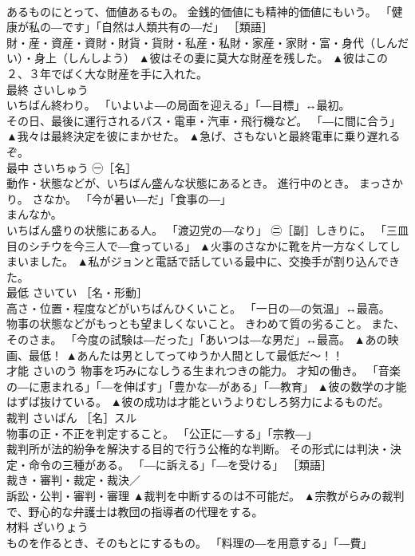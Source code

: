 \documentclass[8pt]{extreport}
\begin{document}
\begin{CJK}{UTF8}{min}
\\	あるものにとって、価値あるもの。 金銭的価値にも精神的価値にもいう。 「健康が私の―です」「自然は人類共有の―だ」 ［類語］
\\	財・産・資産・資財・財貨・貨財・私産・私財・家産・家財・富・身代（しんだい）・身上（しんしよう）	▲彼はその妻に莫大な財産を残した。 ▲彼はこの２、３年でばく大な財産を手に入れた。
\\	最終	さいしゅう	
\\	いちばん終わり。 「いよいよ―の局面を迎える」「―目標」↔最初。 
\\	その日、最後に運行されるバス・電車・汽車・飛行機など。 「―に間に合う」	▲我々は最終決定を彼にまかせた。 ▲急げ、さもないと最終電車に乗り遅れるぞ。
\\	最中	さいちゅう	㊀［名］ 
\\	動作・状態などが、いちばん盛んな状態にあるとき。 進行中のとき。 まっさかり。 さなか。 「今が暑い―だ」「食事の―」 
\\	まんなか。 
\\	いちばん盛りの状態にある人。 「渡辺党の―なり」 ㊁［副］しきりに。 「三皿目のシチウを今三人で―食っている」	▲火事のさなかに靴を片一方なくしてしまいました。 ▲私がジョンと電話で話している最中に、交換手が割り込んできた。
\\	最低	さいてい	［名・形動］ 
\\	高さ・位置・程度などがいちばんひくいこと。 「一日の―の気温」↔最高。 
\\	物事の状態などがもっとも望ましくないこと。 きわめて質の劣ること。 また、そのさま。 「今度の試験は―だった」「あいつは―な男だ」↔最高。	▲あの映画、最低！ ▲あんたは男としてってゆうか人間として最低だ〜！！
\\	才能	さいのう	物事を巧みになしうる生まれつきの能力。 才知の働き。 「音楽の―に恵まれる」「―を伸ばす」「豊かな―がある」「―教育」	▲彼の数学の才能はずば抜けている。 ▲彼の成功は才能というよりむしろ努力によるものだ。
\\	裁判	さいばん	［名］スル 
\\	物事の正・不正を判定すること。 「公正に―する」「宗教―」 
\\	裁判所が法的紛争を解決する目的で行う公権的な判断。 その形式には判決・決定・命令の三種がある。 「―に訴える」「―を受ける」 ［類語］
\\	裁き・審判・裁定・裁決／
\\	訴訟・公判・審判・審理	▲裁判を中断するのは不可能だ。 ▲宗教がらみの裁判で、野心的な弁護士は教団の指導者の代理をする。
\\	材料	ざいりょう	
\\	ものを作るとき、そのもとにするもの。 「料理の―を用意する」「―費」 

\end{CJK}
\end{document}
